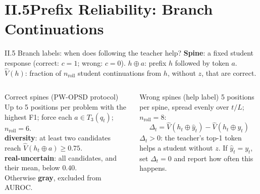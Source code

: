 \section{II.5\quad Prefix Reliability: Branch Continuations}

\begin{frame}{II.5 Branch labels: when does following the teacher help?}
\small
\textbf{Spine}: a fixed student response (correct: $c=1$; wrong: $c=0$). $h\oplus a$: prefix $h$ followed by token $a$. $\hat V(h)$: fraction of $n_{\mathrm{roll}}$ student continuations from $h$, without $z$, that are correct.
\begin{columns}[T]
\begin{block}{Correct spines (PW-OPSD protocol)}
\footnotesize
Up to 5 positions per problem with the highest F1; force each $a\in T_3(q_t)$; $n_{\mathrm{roll}}=6$.\\
\textbf{diversity}: at least two candidates reach $\hat V(h_t\oplus a)\ge0.75$.\\
\textbf{real-uncertain}: all candidates, and their mean, below $0.40$.\\
Otherwise \textbf{gray}, excluded from AUROC.
\end{block}
\begin{block}{Wrong spines (help label)}
\footnotesize
5 positions per spine, spread evenly over $t/L$; $n_{\mathrm{roll}}=8$:
\[
\Delta_t=\hat V(h_t\oplus\hat y_t)-\hat V(h_t\oplus y_t)
\]
$\Delta_t>0$: the teacher's top-1 token helps a student without $z$. If $\hat y_t=y_t$, set $\Delta_t=0$ and report how often this happens.
\end{block}
\end{columns}
\vspace{2pt}
\end{frame}

